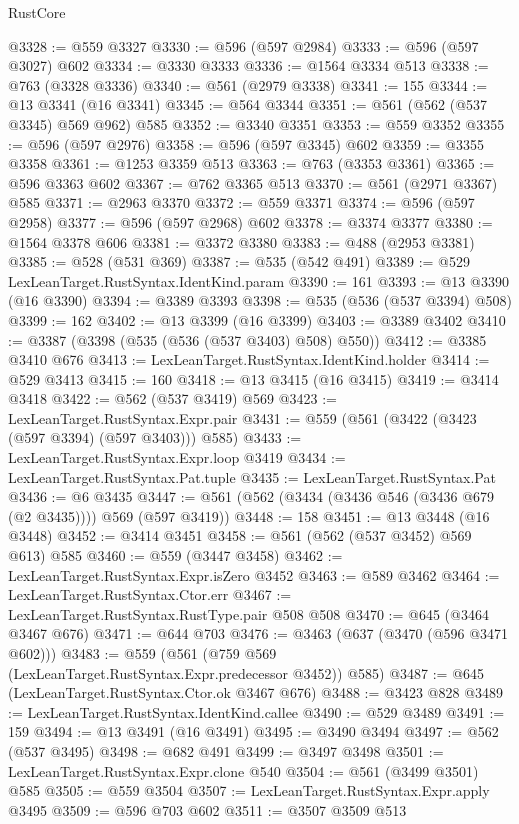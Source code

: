 \begin{lexlean}{RustCore}
\begin{coremodule}
@3328 := @559 @3327
@3330 := @596 (@597 @2984)
@3333 := @596 (@597 @3027) @602
@3334 := @3330 @3333
@3336 := @1564 @3334 @513
@3338 := @763 (@3328 @3336)
@3340 := @561 (@2979 @3338)
@3341 := 155
@3344 := @13 @3341 (@16 @3341)
@3345 := @564 @3344
@3351 := @561 (@562 (@537 @3345) @569 @962) @585
@3352 := @3340 @3351
@3353 := @559 @3352
@3355 := @596 (@597 @2976)
@3358 := @596 (@597 @3345) @602
@3359 := @3355 @3358
@3361 := @1253 @3359 @513
@3363 := @763 (@3353 @3361)
@3365 := @596 @3363 @602
@3367 := @762 @3365 @513
@3370 := @561 (@2971 @3367) @585
@3371 := @2963 @3370
@3372 := @559 @3371
@3374 := @596 (@597 @2958)
@3377 := @596 (@597 @2968) @602
@3378 := @3374 @3377
@3380 := @1564 @3378 @606
@3381 := @3372 @3380
@3383 := @488 (@2953 @3381)
@3385 := @528 (@531 @369)
@3387 := @535 (@542 @491)
@3389 := @529 LexLeanTarget.RustSyntax.IdentKind.param
@3390 := 161
@3393 := @13 @3390 (@16 @3390)
@3394 := @3389 @3393
@3398 := @535 (@536 (@537 @3394) @508)
@3399 := 162
@3402 := @13 @3399 (@16 @3399)
@3403 := @3389 @3402
@3410 := @3387 (@3398 (@535 (@536 (@537 @3403) @508) @550))
@3412 := @3385 @3410 @676
@3413 := LexLeanTarget.RustSyntax.IdentKind.holder
@3414 := @529 @3413
@3415 := 160
@3418 := @13 @3415 (@16 @3415)
@3419 := @3414 @3418
@3422 := @562 (@537 @3419) @569
@3423 := LexLeanTarget.RustSyntax.Expr.pair
@3431 := @559 (@561 (@3422 (@3423 (@597 @3394) (@597 @3403))) @585)
@3433 := LexLeanTarget.RustSyntax.Expr.loop @3419
@3434 := LexLeanTarget.RustSyntax.Pat.tuple
@3435 := LexLeanTarget.RustSyntax.Pat
@3436 := @6 @3435
@3447 := @561 (@562 (@3434 (@3436 @546 (@3436 @679 (@2 @3435)))) @569 (@597 @3419))
@3448 := 158
@3451 := @13 @3448 (@16 @3448)
@3452 := @3414 @3451
@3458 := @561 (@562 (@537 @3452) @569 @613) @585
@3460 := @559 (@3447 @3458)
@3462 := LexLeanTarget.RustSyntax.Expr.isZero @3452
@3463 := @589 @3462
@3464 := LexLeanTarget.RustSyntax.Ctor.err
@3467 := LexLeanTarget.RustSyntax.RustType.pair @508 @508
@3470 := @645 (@3464 @3467 @676)
@3471 := @644 @703
@3476 := @3463 (@637 (@3470 (@596 @3471 @602)))
@3483 := @559 (@561 (@759 @569 (LexLeanTarget.RustSyntax.Expr.predecessor @3452)) @585)
@3487 := @645 (LexLeanTarget.RustSyntax.Ctor.ok @3467 @676)
@3488 := @3423 @828
@3489 := LexLeanTarget.RustSyntax.IdentKind.callee
@3490 := @529 @3489
@3491 := 159
@3494 := @13 @3491 (@16 @3491)
@3495 := @3490 @3494
@3497 := @562 (@537 @3495)
@3498 := @682 @491
@3499 := @3497 @3498
@3501 := LexLeanTarget.RustSyntax.Expr.clone @540
@3504 := @561 (@3499 @3501) @585
@3505 := @559 @3504
@3507 := LexLeanTarget.RustSyntax.Expr.apply @3495
@3509 := @596 @703 @602
@3511 := @3507 @3509 @513

\end{coremodule}
\end{lexlean}
